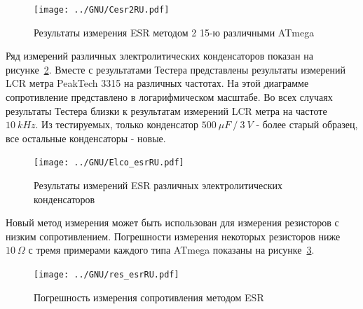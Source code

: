 \begin{figure}[H]
\centering
\texttt{[image: ../GNU/Cesr2RU.pdf]}
\caption{Результаты измерения ESR методом 2 15-ю различными ATmega}
\label{fig:Cesr2}
\end{figure}

Ряд измерений различных электролитических конденсаторов показан на рисунке~\ref{fig:ElcoESR}.
Вместе с результатами Тестера представлены результаты измерений LCR метра PeakTech 3315 на различных частотах. На 
этой диаграмме сопротивление представлено в логарифмическом масштабе. Во всех случаях результаты Тестера близки к 
результатам измерений LCR метра на частоте \(10~kHz\). Из тестируемых, только конденсатор \(500~\mu F~/~3~V\) - более 
старый образец, все остальные конденсаторы - новые.

\begin{figure}[H]
\centering
\texttt{[image: ../GNU/Elco\_esrRU.pdf]}
\caption{Результаты измерений ESR различных электролитических конденсаторов}
\label{fig:ElcoESR}
\end{figure}


Новый метод измерения может быть использован для измерения резисторов с низким сопротивлением. Погрешности измерения 
некоторых резисторов ниже \(10~\Omega\) с тремя примерами каждого типа ATmega показаны на рисунке~\ref{fig:res_esr}. 

\begin{figure}[H]
\centering
\texttt{[image: ../GNU/res\_esrRU.pdf]}
\caption{Погрешность измерения сопротивления методом ESR}
\label{fig:res_esr}
\end{figure}

